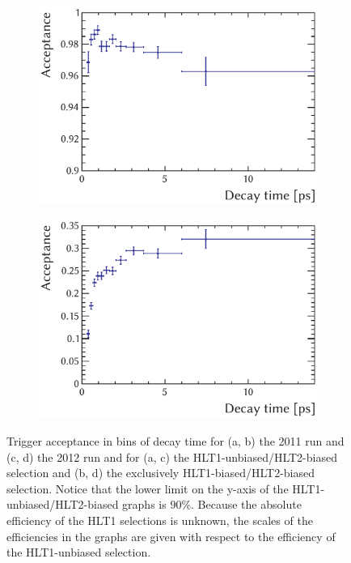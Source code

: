 \begin{figure}[htbp]
  \vspace*{0.02\textwidth}
  \begin{subfigure}{0.49\textwidth}
    \includegraphics[width=\textwidth]{graphics/analysis/trigTimeAcc_2012_UB}
    \caption{}
    \label{fig:trigAcc_2012_UB}
  \end{subfigure}%
  \hfill%
  \begin{subfigure}{0.49\textwidth}
    \includegraphics[width=\textwidth]{graphics/analysis/trigTimeAcc_2012_exclB}
    \caption{}
    \label{fig:trigAcc_2012_exclB}
  \end{subfigure}
  \caption{Trigger acceptance in bins of decay time for (a, b) the 2011 run and (c, d) the 2012 run
           and for (a, c) the HLT1-unbiased/HLT2-biased selection and (b, d) the exclusively HLT1-biased/HLT2-biased selection.
           Notice that the lower limit on the y-axis of the HLT1-unbiased/HLT2-biased graphs is 90\%.
           Because the absolute efficiency of the HLT1 selections is unknown, the scales of the efficiencies
           in the graphs are given with respect to the efficiency of the HLT1-unbiased selection.}
  \label{fig:trigAcc}
\end{figure}

